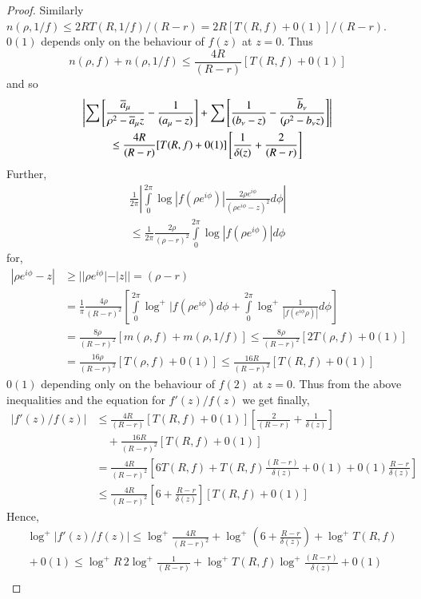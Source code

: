 \begin{proof}
Similarly $n(\rho,1/f)\leq
2RT(R,1/f)/(R-r)=2R[T(R,f)+0(1)]/(R-r)$. $0(1)$ depends only on the
behaviour of $f(z)$ at $z=0$. Thus
$$
n(\rho,f)+n(\rho,1/f)\leq \frac{4R}{(R-r)}[T(R,f)+0(1)]
$$
and so
\begin{gather*}
\left|\sum\left[\frac{\overline{a}_{\mu}}{\rho^{2}-\overline{a}_{\mu}z}-\frac{1}{(a_{\mu}-z)}\right]+\sum\left[\frac{1}{(b_{\nu}-z)}-\frac{\overline{b}_{\nu}}{(\rho^{2}-b_{\nu}z)}\right]\right|\\
\leq
\frac{4R}{(R-r)}[T(R,f)+0(1)]\left[\frac{1}{\delta(z)}+\frac{2}{(R-r)}\right] 
\end{gather*}
Further,
\begin{gather*}
\frac{1}{2\pi}\left|\int\limits^{2\pi}_{0}\log|f(\rho
e^{i\phi})|\frac{2\rho e^{i\phi}}{(\rho e^{i\phi}-z)^{2}}d\phi\right|\\
\leq \frac{1}{2\pi}\frac{2\rho}{(\rho-r)^{2}}\int\limits^{2\pi}_{0}\log |f(\rho e^{i\phi})|d\phi 
\end{gather*}\pageoriginale
for,
\begin{align*}
|\rho e^{i\phi}-z| &\geq ||\rho e^{i\phi}|-|z||=(\rho-r)\\
&= \frac{1}{\pi}\frac{4\rho}{(R-r)^{2}}\left[\int\limits^{2\pi}_{0}\log^{+}|f(\rho e^{i\phi})d\phi+\int\limits^{2\pi}_{0}\log^{+}\frac{1}{|f(e^{i\phi}\rho)|}d\phi\right]\\
&= \frac{8\rho}{(R-r)^{2}}[m(\rho,f)+m(\rho,1/f)]\leq \frac{8\rho}{(R-r)^{2}}[2T(\rho,f)+0(1)]\\
&= \frac{16\rho}{(R-r)^{2}}[T(\rho,f)+0(1)]\leq \frac{16R}{(R-r)^{2}}[T(R,f)+0(1)] 
\end{align*}
$0(1)$ depending only on the behaviour of $f(2)$ at $z=0$. Thus from
the above inequalities and the equation for $f'(z)/f(z)$ we get
finally, 
\begin{align*}
|f'(z)/f(z)| &\leq
\frac{4R}{(R-r)}[T(R,f)+0(1)]\left[\frac{2}{(R-r)}+\frac{1}{\delta(z)}\right]\\
&\quad +\frac{16R}{(R-r)^{2}}[T(R,f)+0(1)]\\
&=\frac{4R}{(R-r)^{2}}\left[6T(R,f)+T(R,
  f)\frac{(R-r)}{\delta(z)}+0(1)+0(1)\frac{R-r}{\delta(z)}\right]\\
&\leq
\frac{4R}{(R-r)^{2}}\left[6+\frac{R-r}{\delta(z)}\right][T(R, f)+0(1)]
\end{align*}
Hence,
\begin{align*}
& \log^{+}|f'(z)/f(z)|\leq
\log^{+}\frac{4R}{(R-r)^{2}}+\log^{+}\left(6+\frac{R-r}{\delta(z)}\right)+\log^{+}T(R,f)\\
&{}+0(1)\leq
\log^{+}R \,2\log^{+}\frac{1}{(R-r)}+\log^{+}T(R,f)\log^{+}\frac{(R-r)}{\delta(z)}+0(1)\\ 

\end{align*}
\end{proof}
